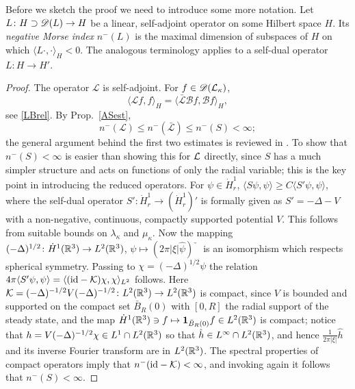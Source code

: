 \documentclass[11pt]{article}
\begin{document}
Before we sketch the proof we need to introduce some more notation.
Let $L\colon H\supset {\mathscr D}(L) \to H$
be a linear, self-adjoint operator on some
Hilbert space $H$.
Its {\em negative Morse index} $n^{-}\left(L\right)$
is the maximal dimension of subspaces of $H$ on which
$\langle L\cdot,\cdot\rangle_H <0$.  The analogous terminology
applies to a self-dual operator $L\colon H \to H'$.
%
%
\begin{proof}
  The operator $\mathcal L$ is self-adjoint. For $f\in {\mathscr D}(\mathcal L_\kappa)$,
  \[
  \langle\mathcal{L}f,f\rangle_H =\langle\bar{\mathcal{L}}
  \mathcal{B}f ,\mathcal{B}f\rangle_H,
  \]
  see \eqref{LBrel}.
  By Prop.~\ref{ASest}, 
  \[
  n^{-}\left( \mathcal{L}\right) \leq
  n^{-}\left( \bar{\mathcal{L}}\right)
  \le n^{-}\left( S\right) <\infty;
  \]
  the general argument behind
  the first two estimates is reviewed in \cite[Lemma~A.1]{HaLinRe}.
  To show that $n^{-}\left( S\right) <\infty$
  is easier than showing this for ${\cal L}$ directly, since $S$
  has a much simpler structure and acts on functions of only the
  radial variable; this is the key point in introducing the reduced operators.
  For $\psi \in \dot H^1_r$,
  $\langle S \psi,\psi\rangle \geq C \langle S' \psi,\psi\rangle$,
  where the self-dual operator
  $S' \colon  \dot H^1_r\to (\dot H^1_r)'$ is formally given as
  $S' = -\Delta -V$ with a non-negative, continuous, compactly supported
  potential $V$. This follows from suitable bounds on
  $\lambda_\kappa$ and $\mu_\kappa$. Now the mapping
  $(-\Delta)^{1/2} \colon \dot H^1(\mathbb R^3) \to L^2(\mathbb R^3)$,
  $\psi\mapsto (2\pi |\xi|\hat\psi)\check{\phantom{\psi}}$ is an
  isomorphism which respects
  spherical symmetry. Passing to
  $\chi = (-\Delta)^{1/2}\psi$ the relation
  $4 \pi \langle S' \psi,\psi\rangle
  = \langle (\mathrm{id}-{\cal K})\chi,\chi\rangle_{L^2}$
  follows.
  Here ${\cal K}=(-\Delta)^{-1/2}V(-\Delta)^{-1/2}\colon L^2(\mathbb R^3) \to  L^2(\mathbb R^3)$
  is compact, since $V$ is bounded and supported on the compact set
  $\bar B_{R}(0)$ with $[0,R]$ the radial support of the steady state,
  and the map
  $\dot H^1(\mathbb R^3) \ni f \mapsto {\bf 1}_{\bar B_{R}(0)} f\in L^2(\mathbb R^3)$ is compact;
  notice that $h = V(-\Delta)^{-1/2}\chi\in L^1\cap L^2(\mathbb R^3)$ so that
  $\hat h\in L^\infty \cap L^2(\mathbb R^3)$, and hence $\frac{1}{2 \pi|\xi|} \hat h$
  and its inverse Fourier transform are in $L^2(\mathbb R^3)$.
  The spectral properties of compact operators imply that
  $n^-(\mathrm{id}-{\cal K}) <\infty$,
  and invoking \cite[Lemma~A.1]{HaLinRe} again it follows that
  $n^{-}\left( S\right) <\infty$.
  

\end{proof}
\end{document}
